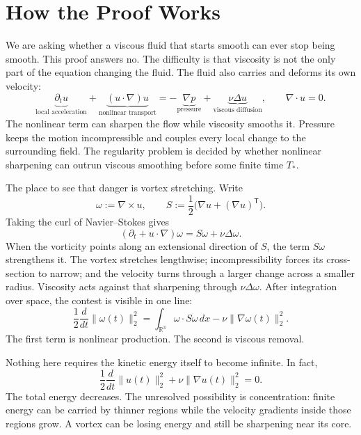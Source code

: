 \begingroup
\setlength{\parindent}{0pt}
\setlength{\parskip}{0.58\baselineskip}
\setlength{\abovedisplayskip}{9pt plus 2pt minus 2pt}
\setlength{\belowdisplayskip}{9pt plus 2pt minus 2pt}
\setlength{\jot}{7pt}

\section*{How the Proof Works}

We are asking whether a viscous fluid that starts smooth can ever stop being
smooth.  This proof answers no.  The difficulty is that viscosity is not the
only part of the equation changing the fluid.  The fluid also carries and
deforms its own velocity:
\[
\underbrace{\partial_tu}_{\text{local acceleration}}
+\underbrace{(u\!\cdot\nabla)u}_{\text{nonlinear transport}}
=-\underbrace{\nabla p}_{\text{pressure}}
+\underbrace{\nu\Delta u}_{\text{viscous diffusion}},
\qquad \nabla\!\cdot u=0.
\]
The nonlinear term can sharpen the flow while viscosity smooths it.  Pressure
keeps the motion incompressible and couples every local change to the
surrounding field.  The regularity problem is decided by whether nonlinear
sharpening can outrun viscous smoothing before some finite time \(T_*\).

The place to see that danger is vortex stretching.  Write
\[
\omega:=\nabla\times u,
\qquad
S:=\frac12\bigl(\nabla u+(\nabla u)^{\mathsf T}\bigr).
\]
Taking the curl of Navier--Stokes gives
\[
(\partial_t+u\!\cdot\nabla)\omega
=S\omega+\nu\Delta\omega.
\]
When the vorticity points along an extensional direction of \(S\), the term
\(S\omega\) strengthens it.  The vortex stretches lengthwise; incompressibility
forces its cross-section to narrow; and the velocity turns through a larger
change across a smaller radius.  Viscosity acts against that sharpening through
\(\nu\Delta\omega\).  After integration over space, the contest is visible in
one line:
\[
\frac12\frac{d}{dt}\|\omega(t)\|_2^2
=\int_{\mathbb R^3}\omega\!\cdot S\omega\,dx
-\nu\|\nabla\omega(t)\|_2^2.
\]
The first term is nonlinear production.  The second is viscous removal.

Nothing here requires the kinetic energy itself to become infinite.  In fact,
\[
\frac12\frac{d}{dt}\|u(t)\|_2^2
+\nu\|\nabla u(t)\|_2^2=0.
\]
The total energy decreases.  The unresolved possibility is concentration:
finite energy can be carried by thinner regions while the velocity gradients
inside those regions grow.  A vortex can be losing energy and still be
sharpening near its core.

